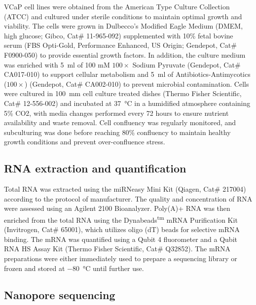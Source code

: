 \documentclass[pdflatex, sn-mathphys-num, lineno]{sn-jnl}%
\theoremstyle{thmstyleone}%
\theoremstyle{thmstyletwo}%
\theoremstyle{thmstylethree}%
\begin{document}
VCaP cell lines were obtained from the American Type Culture Collection (ATCC) and cultured under sterile conditions to maintain optimal growth and viability.
The cells were grown in Dulbecco's Modified Eagle Medium (DMEM, high glucose; Gibco, Cat\# 11-965-092) supplemented with 10\% fetal bovine serum (FBS Opti-Gold, Performance Enhanced, US Origin; Gendepot, Cat\# F0900-050) to provide essential growth factors.
In addition, the culture medium was enriched with \SI{5}{\ml} of 100 mM \( 100\times \) Sodium Pyruvate (Gendepot, Cat\# CA017-010) to support cellular metabolism and \SI{5}{\ml} of Antibiotics-Antimycotics (\( 100\times \)) (Gendepot, Cat\# CA002-010) to prevent microbial contamination.
Cells were cultured in \SI{100}{\mm} cell culture treated dishes (Thermo Fisher Scientific, Cat\# 12-556-002) and incubated at \SI{37}{\degreeCelsius} in a humidified atmosphere containing 5\% CO2, with media changes performed every 72 hours to ensure nutrient availability and waste removal.
Cell confluency was regularly monitored, and subculturing was done before reaching 80\% confluency to maintain healthy growth conditions and prevent over-confluence stress.

\subsection{RNA extraction and quantification}

Total RNA was extracted using the miRNeasy Mini Kit (Qiagen, Cat\# 217004) according to the protocol of manufacturer.
The quality and concentration of RNA were assessed using an Agilent 2100 Bioanalyzer.
Poly(A)+ RNA was then enriched from the total RNA using the Dynabeads\textsuperscript{tm} mRNA Purification Kit (Invitrogen, Cat\# 65001), which utilizes oligo (dT) beads for selective mRNA binding.
The mRNA was quantified using a Qubit 4 fluorometer and a Qubit RNA HS Assay Kit (Thermo Fisher Scientific, Cat\# Q32852).
The mRNA preparations were either immediately used to prepare a sequencing library or frozen and stored at \SI{-80}{\degreeCelsius} until further use.

\subsection{Nanopore sequencing}
\end{document}
